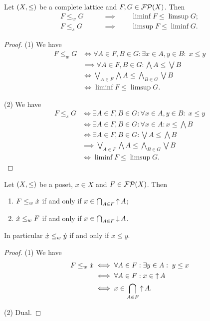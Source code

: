 \begin{lemma} \label{filterInequalityCriterion}
Let $\sSet{X,\leq}$ be a complete lattice and $F,G\in\operatorname{\mathcal{FP}}(X)$. Then
\begin{align*}
F \leq_w G \qquad &\implies\qquad \liminf F \leq \limsup G; \\
F \leq_s G \qquad &\implies\qquad \limsup F \leq \liminf G.
\end{align*}
\end{lemma}
\begin{proof}
(1) We have
\begin{align*}
F \leq_w G &\iff \forall A\in F, B\in G: \exists x\in A, y\in B: \; x \leq y \\
&\implies \forall A\in F, B\in G: \bigwedge A \leq \bigvee B \\
&\iff \bigvee_{A\in F}\bigwedge A \leq \bigwedge_{B\in G}\bigvee B \\
&\iff \liminf F \leq \limsup G.
\end{align*}

(2) We have
\begin{align*}
F \leq_s G &\iff \exists A\in F, B\in G: \forall x\in A, y\in B: \; x \leq y \\
&\iff \exists A\in F, B\in G: \forall x\in A: x \leq \bigwedge B \\
&\iff \exists A\in F, B\in G: \bigvee A \leq \bigwedge B \\
&\implies \bigvee_{A\in F}\bigwedge A \leq \bigwedge_{B\in G}\bigvee B \\
&\iff \liminf F \leq \limsup G.
\end{align*}
\end{proof}

\begin{lemma} \label{weakRelationPrincipalFilter}
Let $\sSet{X,\leq}$ be a poset, $x\in X$ and $F\in\operatorname{\mathcal{FP}}(X)$. Then
\begin{enumerate}
\item $F\leq_w \dot{x}$ \textup{if and only if} $x\in \bigcap_{A\in F}\operatorname{\uparrow} A$;
\item $\dot{x} \leq_w F$ \textup{if and only if} $x\in \bigcap_{A\in F}\operatorname{\downarrow} A$.
\end{enumerate}
In particular $\dot{x}\leq_w \dot{y}$ \textup{if and only if} $x\leq y$.
\end{lemma}
\begin{proof}
(1) We have
\begin{align*}
F\leq_w \dot{x} &\iff \forall A\in F: \exists y\in A: \; y\leq x \\
&\iff \forall A\in F: x\in \operatorname{\uparrow} A \\
&\iff x\in \bigcap_{A\in F}\operatorname{\uparrow} A.
\end{align*}

(2) Dual.
\end{proof}

